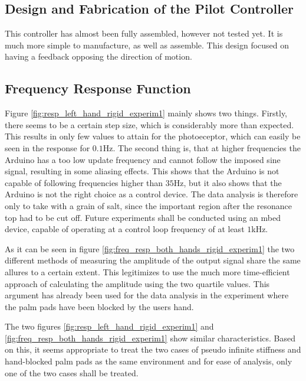 	\subsection{Design and Fabrication of the Pilot Controller}
	This controller has almost been fully assembled, however not tested yet. It is much more simple to manufacture, as well as assemble. This design focused on having a feedback opposing the direction of motion.
	
	
	\subsection{Frequency Response Function}
	Figure \ref{fig:resp_left_hand_rigid_experim1} mainly shows two things. Firstly, there seems to be a certain step size, which is considerably more than expected. This results in only few values to attain for the photoeceptor, which can easily be seen in the response for $0.1$Hz. The second thing is, that at higher frequencies the Arduino has a too low update frequency and cannot follow the imposed sine signal, resulting in some aliasing effects. This shows that the Arduino is not capable of following frequencies higher than $35$Hz, but it also shows that the Arduino is not the right choice as a control device. The data analysis is therefore only to take with a grain of salt, since the important region after the resonance top had to be cut off. Future experiments shall be conducted using an mbed device, capable of operating at a control loop frequency of at least $1$kHz.
	
	As it can be seen in figure \ref{fig:freq_resp_both_hands_rigid_experim1} the two different methods of measuring the amplitude of the output signal share the same allures to a certain extent. This legitimizes to use the much more time-efficient approach of calculating the amplitude using the two quartile values. This argument has already been used for the data analysis in the experiment where the palm pads have been blocked by the users hand.
	
	The two figures \ref{fig:resp_left_hand_rigid_experim1} and \ref{fig:freq_resp_both_hands_rigid_experim1} show similar characteristics. Based on this, it seems appropriate to treat the two cases of pseudo infinite stiffness and hand-blocked palm pads as the same environment and for ease of analysis, only one of the two cases shall be treated.
	
	
	
